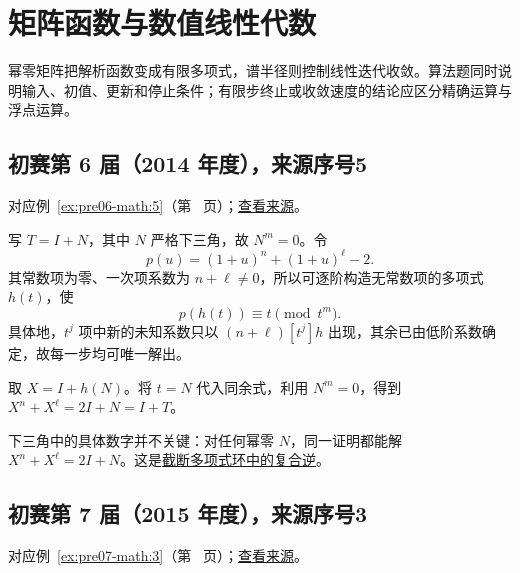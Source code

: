 \documentclass[UTF8,12pt,a4paper,fontset=fandol]{ctexart}
\begin{document}
\section{矩阵函数与数值线性代数}

\label{sec:solutions-10}

幂零矩阵把解析函数变成有限多项式，谱半径则控制线性迭代收敛。算法题同时说明输入、初值、更新和停止条件；有限步终止或收敛速度的结论应区分精确运算与浮点运算。

\subsection{初赛第 6 届（2014 年度），来源序号5}\label{ans:pre06-math:5}\label{pr:pre06-math:5}

对应例~\ref{ex:pre06-math:5}（第~\pageref{ex:pre06-math:5} 页）；\href{https://github.com/lzxcr/cmc-mathematics/blob/64916fa1fdbc3e444a652eca204d5669058ee321/src/problems/preliminary/06/05.md}{查看来源}。

\begin{solve}

写 $T=I+N$，其中 $N$ 严格下三角，故 $N^m=0$。令
\[
p(u)=(1+u)^n+(1+u)^\ell-2.
\]
其常数项为零、一次项系数为 $n+\ell\ne0$，所以可逐阶构造无常数项的多项式 $h(t)$，使
\[
p(h(t))\equiv t\pmod{t^m}.
\]
具体地，$t^j$ 项中新的未知系数只以 $(n+\ell)[t^j]h$ 出现，其余已由低阶系数确定，故每一步均可唯一解出。

取 $X=I+h(N)$。将 $t=N$ 代入同余式，利用 $N^m=0$，得到 $X^n+X^\ell=2I+N=I+T$。

\end{solve}

\begin{remark}[方法与条件]

下三角中的具体数字并不关键：对任何幂零 $N$，同一证明都能解 $X^n+X^\ell=2I+N$。这是\hyperref[app:algebra-interpolation]{截断多项式环中的复合逆}。

\end{remark}

\subsection{初赛第 7 届（2015 年度），来源序号3}\label{ans:pre07-math:3}\label{pr:pre07-math:3}

对应例~\ref{ex:pre07-math:3}（第~\pageref{ex:pre07-math:3} 页）；\href{https://github.com/lzxcr/cmc-mathematics/blob/64916fa1fdbc3e444a652eca204d5669058ee321/src/problems/preliminary/07/03.md}{查看来源}。
\end{document}
